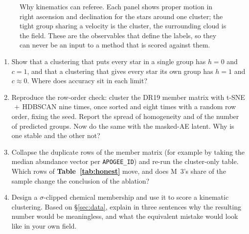 \begin{figure}[htbp]\centering
  \caption{Why kinematics can referee. Each panel shows proper motion in right
  ascension and declination for the stars around one cluster; the tight group
  sharing a velocity is the cluster, the surrounding cloud is the field. These
  are the observables that define the labels, so they can never be an input to
  a method that is scored against them.}
  \label{fig:propermotions}
\end{figure}

\begin{issues}[EXERCISES]
\begin{enumerate}
\item Show that a clustering that puts every star in a single group has
  $h = 0$ and $c = 1$, and that a clustering that gives every star its own
  group has $h = 1$ and $c \approx 0$. Where does accuracy sit in each limit?
\item Reproduce the row-order check: cluster the DR19 member matrix with
  t-SNE$\,+\,$HDBSCAN nine times, once sorted and eight times with a random
  row order, fixing the seed. Report the spread of homogeneity and of the
  number of predicted groups. Now do the same with the masked-AE latent. Why
  is one stable and the other not?
\item Collapse the duplicate rows of the member matrix (for example by taking
  the median abundance vector per \texttt{APOGEE\_ID}) and re-run the
  cluster-only table. Which rows of \textbf{Table~\ref{tab:honest}} move, and
  does M~3's share of the sample change the conclusion of the ablation?
\item Design a $\sigma$-clipped chemical membership and use it to score a
kinematic clustering. Based on \S\ref{sec:data}, explain in three sentences why
the resulting number would be meaningless, and what the equivalent mistake
would look like in your own field.
\end{enumerate}
\end{issues}
